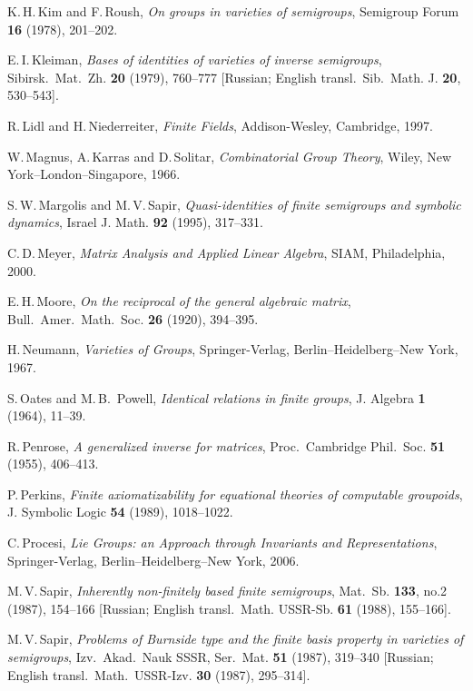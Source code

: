 \documentclass[11pt,reqno]{amsart}
\numberwithin{equation}{section}
\theoremstyle{remark}
\begin{document}
\begin{thebibliography}{99}
K.\,H.\,Kim and F.\,Roush, \emph{On groups in varieties of
semigroups}, Semigroup Forum \textbf{ 16} (1978), 201--202.

E.\,I.\,Kleiman, \emph{Bases of identities of varieties of inverse
semigroups}, Sibirsk.\ Mat.\ Zh. \textbf{20} (1979), 760--777
[Russian; English transl.\ Sib.\ Math. J. \textbf{20}, 530--543].

R.\,Lidl and H.\,Niederreiter, \emph{Finite Fields},
Addison-Wesley, Cambridge, 1997.

W.\,Magnus, A.\,Karras and D.\,Solitar, \emph{Combinatorial Group
Theory}, Wiley, New York--London--Singapore, 1966.

S.\,W.\,Margolis and M.\,V.\,Sapir, \emph{Quasi-identities of
finite semigroups and symbolic dynamics}, Israel J. Math.
\textbf{92} (1995), 317--331.

C.\,D.\,Meyer, \emph{Matrix Analysis and Applied Linear Algebra},
SIAM, Philadelphia, 2000.

E.\,H.\,Moore, \emph{On the reciprocal of the general  algebraic
matrix}, Bull.\ Amer.\ Math.\ Soc. \textbf{26} (1920),  394--395.

H.\,Neumann, \emph{Varieties of Groups}, Springer-Verlag,
Berlin--Heidelberg--New York, 1967.

S.\,Oates and M.\,B.\, Powell, \emph{Identical relations in finite
groups}, J. Algebra  \textbf{1} (1964), 11--39.

R.\,Penrose, \emph{A generalized inverse for matrices}, Proc.\
Cambridge Phil.\ Soc. \textbf{51} (1955), 406--413.

P.\,Perkins, \emph{Finite axiomatizability for equational theories
of computable groupoids}, J. Symbolic Logic \textbf{54} (1989),
1018--1022.

C.\,Procesi, \emph{Lie Groups: an Approach through Invariants and
Representations}, Springer-Verlag, Berlin--Heidelberg--New York,
2006.

M.\,V.\,Sapir, \emph{Inherently non-finitely based finite
semigroups}, Mat.\ Sb. \textbf{133}, no.2 (1987), 154--166
[Russian; English transl.\ Math. USSR-Sb. \textbf{61} (1988),
155--166].

M.\,V.\,Sapir, \emph{Problems of Burnside type and the finite
basis property in varieties of semigroups}, Izv.\ Akad.\ Nauk
SSSR, Ser.\ Mat. \textbf{51} (1987), 319--340 [Russian; English
transl.\ Math.\ USSR-Izv. \textbf{30} (1987), 295--314].


\end{thebibliography}
\end{document}
